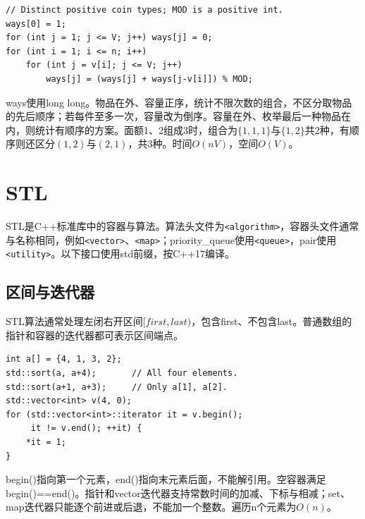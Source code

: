 \documentclass[UTF8,11pt,a4paper,fontset=none]{ctexart}
\begin{document}
\par\noindent\begin{minipage}{\linewidth}
\begin{lstlisting}
// Distinct positive coin types; MOD is a positive int.
ways[0] = 1;
for (int j = 1; j <= V; j++) ways[j] = 0;
for (int i = 1; i <= n; i++)
    for (int j = v[i]; j <= V; j++)
        ways[j] = (ways[j] + ways[j-v[i]]) % MOD;
\end{lstlisting}
\end{minipage}\par
ways使用long long。物品在外、容量正序，统计不限次数的组合，不区分取物品的先后顺序；若每件至多一次，容量改为倒序。容量在外、枚举最后一种物品在内，则统计有顺序的方案。面额1、2组成3时，组合为$\{1,1,1\}$与$\{1,2\}$共2种，有顺序则还区分$(1,2)$与$(2,1)$，共3种。时间$O(nV)$，空间$O(V)$。

\section{STL}
STL是C++标准库中的容器与算法。算法头文件为\texttt{<algorithm>}，容器头文件通常与名称相同，例如\texttt{<vector>}、\texttt{<map>}；priority\_queue使用\texttt{<queue>}，pair使用\texttt{<utility>}。以下接口使用std前缀，按C++17编译。

\subsection{区间与迭代器}
STL算法通常处理左闭右开区间$[first,last)$，包含first、不包含last。普通数组的指针和容器的迭代器都可表示区间端点。
\par\noindent\begin{minipage}{\linewidth}
\begin{lstlisting}
int a[] = {4, 1, 3, 2};
std::sort(a, a+4);       // All four elements.
std::sort(a+1, a+3);     // Only a[1], a[2].
std::vector<int> v(4, 0);
for (std::vector<int>::iterator it = v.begin();
     it != v.end(); ++it) {
    *it = 1;
}
\end{lstlisting}
\end{minipage}\par
begin()指向第一个元素，end()指向末元素后面，不能解引用。空容器满足begin()==end()。指针和vector迭代器支持常数时间的加减、下标与相减；set、map迭代器只能逐个前进或后退，不能加一个整数。遍历n个元素为$O(n)$。
\end{document}
